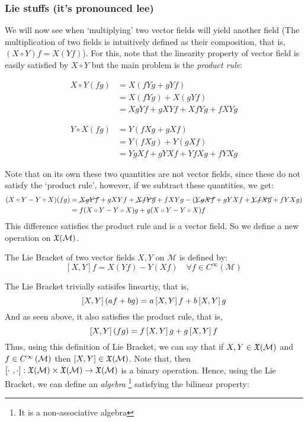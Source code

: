 \subsubsection{Lie stuffs (it's pronounced lee)}
We will now see when `multiplying' two vector fields will yield another field (The multiplication of two fields is intuitively defined as their composition, that is, $(X\circ Y)f = X(Yf)$). For this, note that the linearity property of vector field is easily satisfied by $X\circ Y$ but the main problem is the \textit{product rule}:
\begin{minipage}{0.48\textwidth}
\begin{align*}
  X \circ Y (fg) &= X(fYg + gYf) \\
                 &= X(fYg) + X(gYf) \\
                 &= XgYf + gXYf + XfYg + fXYg
\end{align*}
\end{minipage}
\hfill
\begin{minipage}{0.48\textwidth}
\begin{align*}
  Y \circ X (fg) &= Y(fXg + gXf) \\
                 &= Y(fXg) + Y(gXf) \\
                 &= YgXf + gYXf + YfXg + fYXg
\end{align*}
\end{minipage}
Note that on its own these two quantities are not vector fields, since these do not satisfy the `product rule', however, if we subtract these quantities, we get:
  \begin{align*}
    (X\circ Y - Y\circ X)(fg) &=\cancel{XgYf} + gXYf + \cancel{XfYg} + fXYg - (\cancel{YgXf} + gYXf + \cancel{YfXg} + fYXg)\\
    &= f(X\circ Y - Y\circ X)g +g(X\circ Y - Y\circ X)f
  \end{align*}
  This difference satisfies the product rule and is a vector field. So we define a new operation on $\mathfrak{X}(\mathcal M)$.
\begin{definition}
  The Lie Bracket of two vector fields $X,Y$ on $\mathcal{M}$ is defined by:
  $$[X,Y]f = X(Yf) - Y(Xf) \quad \forall f\in C^\infty(\mathcal{M})$$
\end{definition}
The Lie Bracket trivially satisifes lineartiy, that is,
$$\left[ X, Y \right](af+bg) = a \left[ X, Y \right]f + b \left[ X, Y \right]g$$
And as seen above, it also satisfies the product rule, that is,
$$\left[ X, Y \right](fg) = f\left[ X, Y \right]g + g\left[ X, Y \right]f$$
Thus, using this definition of Lie Bracket, we can say that if $X,Y\in \mathfrak{X}(\mathcal M)$ and $f\in C^{\infty}\left(\mathcal M\right)$ then $\left[ X, Y \right]\in \mathfrak{X}(\mathcal M)$. Note that, then $\left[ \cdot\ , \cdot  \right]:\mathfrak{X}(\mathcal M)\times \mathfrak{X}(\mathcal M)\rightarrow \mathfrak{X}(\mathcal M)$ is a binary operation. Hence, using the Lie Bracket, we can define an \textit{algebra} \footnote{It is a non-associative algebra} satisfying the bilinear property:
